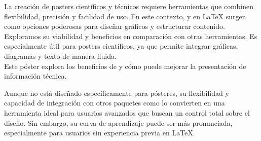 
La creación de posters científicos y técnicos requiere herramientas que combinen flexibilidad, precisión y facilidad de uso. En este contexto,  y
 en LaTeX surgen como opciones poderosas para diseñar gráficos y estructurar contenido.\\
Exploramos su viabilidad y beneficios en comparación con otras herramientas.
Es especialmente útil para posters científicos, ya que permite integrar gráficas, diagramas y texto de manera fluida.\\
Este póster explora los beneficios de  y cómo puede mejorar la presentación de información técnica.

Aunque no está diseñado específicamente para pósteres, su flexibilidad y capacidad de integración con otros paquetes como  lo convierten en una
herramienta ideal para usuarios avanzados que buscan un control total sobre el diseño.
Sin embargo, su curva de aprendizaje puede ser más pronunciada, especialmente para usuarios sin experiencia previa en \LaTeX.